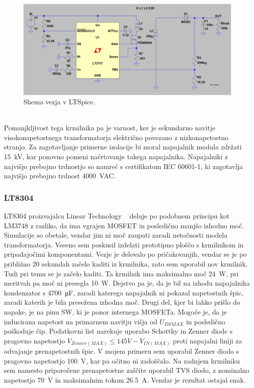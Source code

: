 \documentclass[a4paper,twoside,openright,12pt,Slovene]{book}
\begin{document}
    \begin{figure}[H]
        \centering
        \includegraphics[width=1\columnwidth]{Slike/Simulacije/LM3757spice.png}
        \caption{\label{LM3757spice} Shema vezja v LTSpice.}
    \end{figure}
    
~\\Pomanjkljivost tega krmilnika pa je varnost, ker je sekundarno navitje visokonapetostnega transformatorja električno povezano z nizkonapetostno stranjo. Za zagotavljanje primerne izolacije bi moral napajalnik modula zdržati \SI{15}{\kilo\volt}, kar ponovno pomeni načrtovanje takega napajalnika. Napajalniki z najvišjo prebojno trdnostjo so namreč s certifikatom IEC 60601-1, ki zagotavlja najvišjo prebojno trdnost \SI{4000}{\volt}AC.

	\subsubsection{LT8304} \label{LT8304}
LT8304 proizvajalca Linear Technology ~\cite{analog:LT8304} deluje po podobnem principu kot LM3748 z razliko, da ima vgrajen MOSFET in posledično manjšo izhodno moč. Simulacije so obetale, vendar jim ni moč zaupati zaradi netočnosti modela transformatorja. Vseeno sem poskusil izdelati prototipno ploščo s krmilnikom in pripadajočimi komponentami. Vezje je delovalo po pričakovanjih, vendar se je po približno 20 sekundah začelo kaditi iz krmilnika, zato sem uporabil nov krmilnik.
Tudi pri temu se je začelo kaditi. Ta krmilnik ima maksimalno moč \SI{24}{\watt}, pri meritvah pa moč ni presegla \SI{10}{\watt}. Dejstvo pa je, da je bil na izhodu napajalnika kondenzator s \SI{4700}{\micro\farad}, zaradi katerega napajalnik ni pokazal napetostnih špic, zaradi katerih je bila presežena izhodna moč. Drugi del, kjer bi lahko prišlo do napake, je na pinu SW, ki je ponor internega MOSFETa. Mogoče je, da je inducirana napetost na primarnem navitju višja od \(U_{DS MAX}\) in posledično poškoduje čip. Podatkovni list narekuje uporabo Schottky in Zenner diode s pragovno napetostjo \(V_{Zenner(MAX)} \leq 145 V - V_{IN(MAX)}\) proti napajalni liniji za odvajanje prenapetostnih špic. V mojem primeru sem uporabil Zenner diodo s pragovno napetostjo \SI{100}{\volt}, kar pa očitno ni zadoščalo. Na zadnjem krmilniku sem namesto priporočene prenapetostne zaščite uporabil TVS diodo, z nominalno napetostjo \SI{70}{\volt} in maksimalnim tokom \SI{26,5}{\ampere}. Vendar je rezultat ostajal enak.
\end{document}

